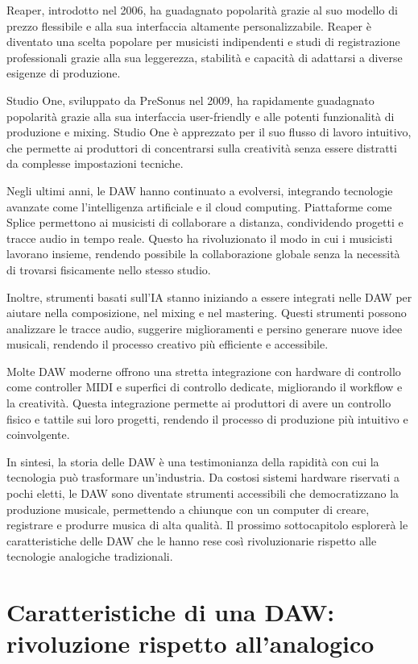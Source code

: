 \documentclass{book}
\begin{document}
Reaper, introdotto nel 2006, ha guadagnato popolarità grazie al suo modello di prezzo flessibile e alla sua interfaccia altamente personalizzabile. Reaper è diventato una scelta popolare per musicisti indipendenti e studi di registrazione professionali grazie alla sua leggerezza, stabilità e capacità di adattarsi a diverse esigenze di produzione.

Studio One, sviluppato da PreSonus nel 2009, ha rapidamente guadagnato popolarità grazie alla sua interfaccia user-friendly e alle potenti funzionalità di produzione e mixing. Studio One è apprezzato per il suo flusso di lavoro intuitivo, che permette ai produttori di concentrarsi sulla creatività senza essere distratti da complesse impostazioni tecniche.

Negli ultimi anni, le DAW hanno continuato a evolversi, integrando tecnologie avanzate come l’intelligenza artificiale e il cloud computing. Piattaforme come Splice permettono ai musicisti di collaborare a distanza, condividendo progetti e tracce audio in tempo reale. Questo ha rivoluzionato il modo in cui i musicisti lavorano insieme, rendendo possibile la collaborazione globale senza la necessità di trovarsi fisicamente nello stesso studio.

Inoltre, strumenti basati sull’IA stanno iniziando a essere integrati nelle DAW per aiutare nella composizione, nel mixing e nel mastering. Questi strumenti possono analizzare le tracce audio, suggerire miglioramenti e persino generare nuove idee musicali, rendendo il processo creativo più efficiente e accessibile.

Molte DAW moderne offrono una stretta integrazione con hardware di controllo come controller MIDI e superfici di controllo dedicate, migliorando il workflow e la creatività. Questa integrazione permette ai produttori di avere un controllo fisico e tattile sui loro progetti, rendendo il processo di produzione più intuitivo e coinvolgente.

In sintesi, la storia delle DAW è una testimonianza della rapidità con cui la tecnologia può trasformare un’industria. Da costosi sistemi hardware riservati a pochi eletti, le DAW sono diventate strumenti accessibili che democratizzano la produzione musicale, permettendo a chiunque con un computer di creare, registrare e produrre musica di alta qualità. Il prossimo sottocapitolo esplorerà le caratteristiche delle DAW che le hanno rese così rivoluzionarie rispetto alle tecnologie analogiche tradizionali.

\section{Caratteristiche di una DAW: rivoluzione rispetto all’analogico}
\end{document}
